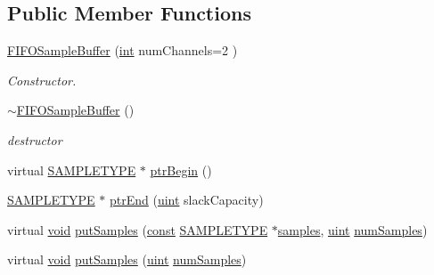 \subsection*{Public Member Functions}
\begin{DoxyCompactItemize}
\item 
\hyperlink{classsoundtouch_1_1_f_i_f_o_sample_buffer_a5b227717b07215a1fb7a5125f2418dde}{F\+I\+F\+O\+Sample\+Buffer} (\hyperlink{xmltok_8h_a5a0d4a5641ce434f1d23533f2b2e6653}{int} num\+Channels=2   )
\begin{DoxyCompactList}\small\item\em Constructor. \end{DoxyCompactList}\item 
\hyperlink{classsoundtouch_1_1_f_i_f_o_sample_buffer_adc9e09731283269276d3b00d68cb45e3}{$\sim$\+F\+I\+F\+O\+Sample\+Buffer} ()
\begin{DoxyCompactList}\small\item\em destructor \end{DoxyCompactList}\item 
virtual \hyperlink{namespacesoundtouch_a97cfd29a7abb4d4b2a72f803d5b5850c}{S\+A\+M\+P\+L\+E\+T\+Y\+PE} $\ast$ \hyperlink{classsoundtouch_1_1_f_i_f_o_sample_buffer_ac5342c9dbb7863c54500501d74c6a2d4}{ptr\+Begin} ()
\item 
\hyperlink{namespacesoundtouch_a97cfd29a7abb4d4b2a72f803d5b5850c}{S\+A\+M\+P\+L\+E\+T\+Y\+PE} $\ast$ \hyperlink{classsoundtouch_1_1_f_i_f_o_sample_buffer_a03d285e2148ec382caefd4d399ccb720}{ptr\+End} (\hyperlink{_s_t_types_8h_a91ad9478d81a7aaf2593e8d9c3d06a14}{uint} slack\+Capacity)
\item 
virtual \hyperlink{sound_8c_ae35f5844602719cf66324f4de2a658b3}{void} \hyperlink{classsoundtouch_1_1_f_i_f_o_sample_buffer_a94f2865cbc6f487b936dd69424410e97}{put\+Samples} (\hyperlink{getopt1_8c_a2c212835823e3c54a8ab6d95c652660e}{const} \hyperlink{namespacesoundtouch_a97cfd29a7abb4d4b2a72f803d5b5850c}{S\+A\+M\+P\+L\+E\+T\+Y\+PE} $\ast$\hyperlink{test__w__saw8_8c_a54185623a5a093f671a73e5fba6197a1}{samples}, \hyperlink{_s_t_types_8h_a91ad9478d81a7aaf2593e8d9c3d06a14}{uint} \hyperlink{classsoundtouch_1_1_f_i_f_o_sample_buffer_a6b6b914d52e4e5d952f160e9c3b54d66}{num\+Samples})
\item 
virtual \hyperlink{sound_8c_ae35f5844602719cf66324f4de2a658b3}{void} \hyperlink{classsoundtouch_1_1_f_i_f_o_sample_buffer_afda08dabb67d6015e9cfb8a7045a6b5c}{put\+Samples} (\hyperlink{_s_t_types_8h_a91ad9478d81a7aaf2593e8d9c3d06a14}{uint} \hyperlink{classsoundtouch_1_1_f_i_f_o_sample_buffer_a6b6b914d52e4e5d952f160e9c3b54d66}{num\+Samples})

\end{DoxyCompactItemize}
